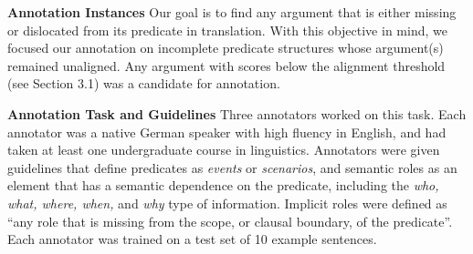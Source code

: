 \documentclass[11pt]{article}
\begin{document}
{\bf \flushleft Annotation Instances}
Our goal is to find any argument that is either missing or dislocated from its predicate in translation. With this objective in mind, we focused our annotation on incomplete predicate structures whose argument(s) remained unaligned. Any argument with scores below the alignment threshold (see Section 3.1) was a candidate for annotation.

{\bf  \flushleft Annotation Task and Guidelines}
Three annotators worked on this task. Each annotator was a native German speaker with high fluency in English, and had taken at least one undergraduate course in linguistics. Annotators were given guidelines that define predicates as \textit{events} or \textit{scenarios}, and semantic roles as an element that has a semantic dependence on the predicate, including the \textit{who, what, where, when,} and \textit{why} type of information. Implicit roles were defined as ``any role that is missing from the scope, or clausal boundary, of the predicate''.  Each annotator was trained on a test set of 10 example sentences.%
\end{document}
